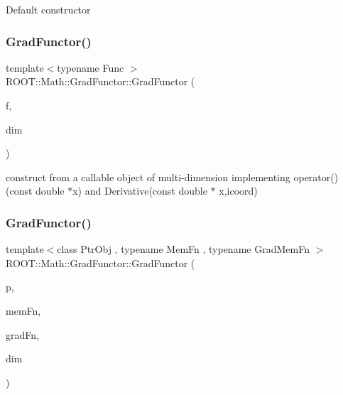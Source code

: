 Default constructor \mbox{\label{classROOT_1_1Math_1_1GradFunctor_a9cdbcd3d49494b4209524b3c5b3172d2}} 
\subsubsection{\texorpdfstring{GradFunctor()}{GradFunctor()}\hspace{0.1cm}{\footnotesize\ttfamily [7/15]}}
{\footnotesize\ttfamily template$<$typename Func $>$ \\
R\+O\+O\+T\+::\+Math\+::\+Grad\+Functor\+::\+Grad\+Functor (\begin{DoxyParamCaption}\item[{const Func \&}]{f,  }\item[{unsigned int}]{dim }\end{DoxyParamCaption})\hspace{0.3cm}{\ttfamily [inline]}}

construct from a callable object of multi-\/dimension implementing operator()(const double $\ast$x) and Derivative(const double $\ast$ x,icoord) \mbox{\label{classROOT_1_1Math_1_1GradFunctor_af7c06950b37bea8844b81f53b0bf41df}} 
\subsubsection{\texorpdfstring{GradFunctor()}{GradFunctor()}\hspace{0.1cm}{\footnotesize\ttfamily [8/15]}}
{\footnotesize\ttfamily template$<$class Ptr\+Obj , typename Mem\+Fn , typename Grad\+Mem\+Fn $>$ \\
R\+O\+O\+T\+::\+Math\+::\+Grad\+Functor\+::\+Grad\+Functor (\begin{DoxyParamCaption}\item[{const Ptr\+Obj \&}]{p,  }\item[{Mem\+Fn}]{mem\+Fn,  }\item[{Grad\+Mem\+Fn}]{grad\+Fn,  }\item[{unsigned int}]{dim }\end{DoxyParamCaption})\hspace{0.3cm}{\ttfamily [inline]}}

